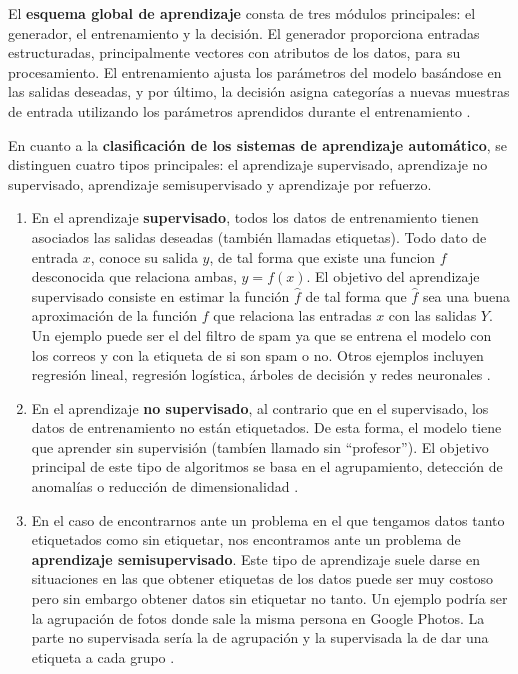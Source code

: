 El \textbf{esquema global de aprendizaje} consta de tres módulos principales: el generador, el entrenamiento y la decisión. El generador proporciona entradas estructuradas, principalmente vectores con atributos de los datos, para su procesamiento. El entrenamiento ajusta los parámetros del modelo basándose en las salidas deseadas, y por último, la decisión asigna categorías a nuevas muestras de entrada utilizando los parámetros aprendidos durante el entrenamiento \citep{pajares2021aprendizaje}.


En cuanto a la \textbf{clasificación de los sistemas de aprendizaje automático}, se distinguen cuatro tipos principales: el aprendizaje supervisado, aprendizaje no supervisado, aprendizaje semisupervisado y aprendizaje por refuerzo.

\begin{enumerate}
	\item En el aprendizaje \textbf{supervisado}, todos los datos de entrenamiento tienen asociados las salidas deseadas (también llamadas etiquetas). Todo dato de entrada \( x \), conoce su salida \( y \), de tal forma que existe una funcion $f$ desconocida que relaciona ambas, $y=f(x)$. El objetivo del aprendizaje supervisado consiste en estimar la función $\hat{f}$ de tal forma que $\hat{f}$ sea una buena aproximación de la función $f$ que relaciona las entradas $x$ con las salidas $Y$. Un ejemplo puede ser el del filtro de spam ya que se entrena el modelo con los correos y con la etiqueta de si son spam o no. Otros ejemplos incluyen regresión lineal, regresión logística, árboles de decisión y redes neuronales \citep{geron2022hands}.

	\item En el aprendizaje \textbf{no supervisado}, al contrario que en el supervisado, los datos de entrenamiento no están etiquetados. De esta forma, el modelo tiene que aprender sin supervisión (tambíen llamado sin ``profesor''). El objetivo principal de este tipo de algoritmos se basa en el agrupamiento, detección de anomalías o reducción de dimensionalidad \citep{geron2022hands}. 

	\item En el caso de encontrarnos ante un problema en el que tengamos datos tanto etiquetados como sin etiquetar, nos encontramos ante un problema de \textbf{aprendizaje semisupervisado}. Este tipo de aprendizaje suele darse en situaciones en las que obtener etiquetas de los datos puede ser muy costoso pero sin embargo obtener datos sin etiquetar no tanto. Un ejemplo podría ser la agrupación de fotos donde sale la misma persona en Google Photos. La parte no supervisada sería la de agrupación y la supervisada la de dar una etiqueta a cada grupo \citep{geron2022hands}.


\end{enumerate}
